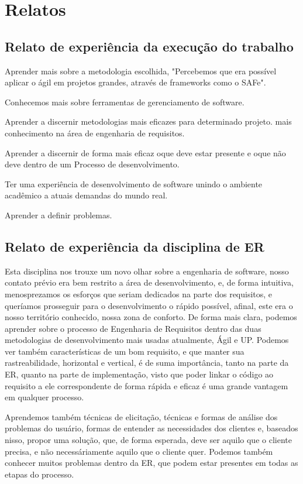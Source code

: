 \chapter{Relatos}

\section{Relato de experiência da execução do trabalho}
  Aprender mais sobre a metodologia escolhida, "Percebemos que era possível aplicar o ágil em projetos grandes, através de frameworks como o SAFe".

  Conhecemos mais sobre ferramentas de gerenciamento de software.

  Aprender a discernir metodologias mais eficazes para determinado projeto.
  mais conhecimento na área de engenharia de requisitos.

  Aprender a discernir de forma mais eficaz oque deve estar presente e oque não deve dentro de um Processo de desenvolvimento.

  Ter uma experiência de desenvolvimento de software unindo o ambiente acadêmico a atuais demandas do mundo real.

  Aprender a definir problemas.

\section{Relato de experiência da disciplina de ER}

Esta disciplina nos trouxe um novo olhar sobre a engenharia de software,
nosso contato prévio era bem restrito a área de desenvolvimento, e, de forma intuitiva, menosprezamos os esforços
que seriam dedicados na parte dos requisitos, e queríamos prosseguir para o desenvolvimento o rápido possível,
afinal, este era o nosso território conhecido, nossa zona de conforto.
De forma mais clara, podemos aprender sobre o processo de Engenharia de Requisitos dentro das duas metodologias
de desenvolvimento mais usadas atualmente, Ágil e UP.
Podemos ver também características de um bom requisito, e que manter sua rastreabilidade, horizontal e vertical,
é de suma importância, tanto na parte da ER, quanto na parte de implementação, visto que poder linkar o código
ao requisito a ele correspondente de forma rápida e eficaz é uma grande vantagem em qualquer processo.

Aprendemos também técnicas de elicitação, técnicas e formas de análise dos problemas do usuário,
formas de entender as necessidades dos clientes e, baseados nisso, propor uma solução, que, de forma esperada,
deve ser aquilo que o cliente precisa, e não necessáriamente aquilo que o cliente quer.
Podemos também conhecer muitos problemas dentro da ER, que podem estar presentes em todas as etapas do processo.

